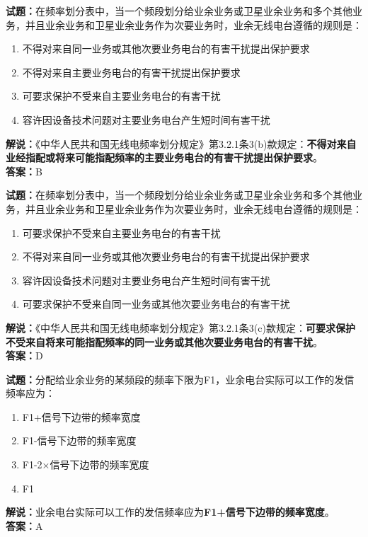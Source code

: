 \documentclass{ctexbook}
\begin{document}
\bigskip


\noindent\textbf{试题：}在频率划分表中，当一个频段划分给业余业务或卫星业余业务和多个其他业务，并且业余业务和卫星业余业务作为次要业务时，业余无线电台遵循的规则是：
\begin{enumerate}[leftmargin=3em]
\item 不得对来自同一业务或其他次要业务电台的有害干扰提出保护要求
\item 不得对来自主要业务电台的有害干扰提出保护要求
\item 可要求保护不受来自主要业务电台的有害干扰
\item 容许因设备技术问题对主要业务电台产生短时间有害干扰
\end{enumerate}
\noindent\textbf{解说：}《中华人民共和国无线电频率划分规定》第3.2.1条3(b)款规定：\textbf{不得对来自业经指配或将来可能指配频率的主要业务电台的有害干扰提出保护要求}。\\\textbf{答案：}B



\bigskip


\noindent\textbf{试题：}在频率划分表中，当一个频段划分给业余业务或卫星业余业务和多个其他业务，并且业余业务和卫星业余业务作为次要业务时，业余无线电台遵循的规则是：
\begin{enumerate}[leftmargin=3em]
\item 可要求保护不受来自主要业务电台的有害干扰
\item 不得对来自同一业务或其他次要业务电台的有害干扰提出保护要求
\item 容许因设备技术问题对主要业务电台产生短时间有害干扰
\item 可要求保护不受来自同一业务或其他次要业务电台的有害干扰
\end{enumerate}
\noindent\textbf{解说：}《中华人民共和国无线电频率划分规定》第3.2.1条3(c)款规定：\textbf{可要求保护不受来自将来可能指配频率的同一业务或其他次要业务电台的有害干扰}。\\\textbf{答案：}D



\bigskip


\noindent\textbf{试题：}分配给业余业务的某频段的频率下限为F1，业余电台实际可以工作的发信频率应为：
\begin{enumerate}[leftmargin=3em]
\item F1+信号下边带的频率宽度
\item F1-信号下边带的频率宽度
\item F1-2×信号下边带的频率宽度
\item F1
\end{enumerate}
\noindent\textbf{解说：}业余电台实际可以工作的发信频率应为\textbf{F1+信号下边带的频率宽度}。\\\noindent\textbf{答案：}A
\end{document}
